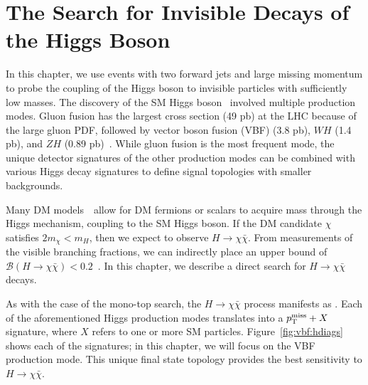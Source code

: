 \chapter{The Search for Invisible Decays of the Higgs Boson}
\label{sec:vbf}

In this chapter, we use events with two forward jets and large missing momentum to probe the coupling of the Higgs boson to invisible particles with sufficiently low masses. 
The discovery of the SM Higgs boson~\cite{higgsdisc} involved multiple production modes.
Gluon fusion has the largest cross section (49 pb) at the LHC because of the large gluon PDF, followed by vector boson fusion (VBF) (3.8 pb), $WH$ (1.4 pb), and $ZH$ (0.89 pb)~\cite{lhchxswg}.
While gluon fusion is the most frequent mode, the unique detector signatures of the other production modes can be combined with various Higgs decay signatures to define signal topologies with smaller backgrounds.

Many DM models~\needcite~allow for DM fermions or scalars to acquire mass through the Higgs mechanism, coupling to the SM Higgs boson.
If the DM candidate $\chi$ satisfies $2m_\chi < m_H$, then we expect to observe $H\rightarrow\chi\bar\chi$.
From measurements of the visible branching fractions, we can indirectly place an upper bound of $\mathcal{B}(H\rightarrow\chi\bar\chi)<0.2$~\needcite.
In this chapter, we describe a direct search for $H\rightarrow\chi\bar\chi$ decays.

As with the case of the mono-top search, the $H\rightarrow\chi\bar\chi$ process manifests as \ptmiss. 
Each of the aforementioned Higgs production modes translates into a $p_\mathrm{T}^\mathrm{miss}+X$ signature, where $X$ refers to one or more SM particles.
Figure~\ref{fig:vbf:hdiags} shows each of the signatures; in this chapter, we will focus on the VBF production mode.
This unique final state topology provides the best sensitivity to $H\rightarrow\chi\bar\chi$.

